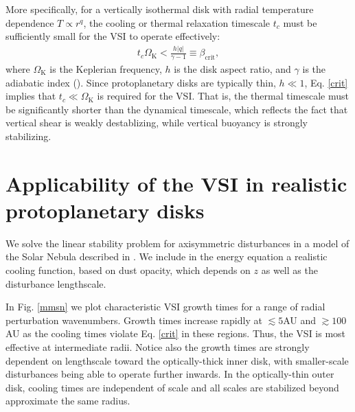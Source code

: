 \documentclass{iau}
\begin{document}
More specifically, for a vertically isothermal disk with radial
temperature dependence $T\propto r^{q}$, the cooling or thermal
relaxation timescale $t_c$ must be sufficiently small for the VSI to
operate effectively:
\begin{align}\label{crit}
  t_c\Omega_\mathrm{K} < \frac{h|q|}{\gamma - 1}\equiv
  \beta_\mathrm{crit},  
\end{align}
where $\Omega_\mathrm{K}$ is the Keplerian frequency, $h$  is the disk
aspect ratio, and $\gamma$ is the adiabatic index (\cite[Lin \& Youdin
2015]{lin15}). 
Since protoplanetary disks are typically thin, $h\ll 1$,
Eq. \ref{crit} implies that $t_c \ll \Omega_\mathrm{K}$ is required
for the VSI. That is, the thermal timescale must be significantly
shorter than the dynamical timescale, which reflects the fact that
vertical shear is weakly destablizing, while vertical buoyancy is
strongly stabilizing. 




\section{Applicability of the VSI in realistic protoplanetary disks} 
We solve the linear stability problem for axisymmetric
disturbances in a model of the Solar Nebula described in \cite[Chiang
\& Youdin (2010)]{chiang10}. We include in the energy equation a
realistic cooling function, based on dust opacity, which depends on
$z$ as well as the disturbance lengthscale.  

In Fig. \ref{mmsn} we plot characteristic VSI growth times for a range
of radial perturbation wavenumbers. Growth times increase rapidly at $\lesssim5$AU
and $\gtrsim 100$AU as the cooling times violate Eq. \ref{crit} in
these regions. Thus, the VSI is most effective at intermediate
radii. Notice also the growth times are strongly dependent on
lengthscale toward the optically-thick inner disk, with smaller-scale
disturbances being able to operate further inwards. In the
optically-thin outer disk, cooling times are independent of scale and
all scales are stabilized beyond approximate the same radius.  
\end{document}
